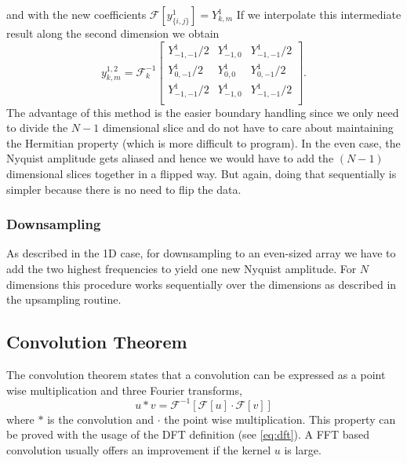 \documentclass{juliacon}
\begin{document}
            and with the new coefficients $\mathcal{F} \left[y^{1}_{\{i, j\}} \right] =Y^{1}_{k, m} $  
            If we interpolate this intermediate result along the second dimension we obtain
            \begin{equation}
                y^{1,2}_{k, m} = \mathcal{F}_{k}^{-1}\begin{bmatrix}
                   Y^1_{-1, -1} /2 &  Y^1_{-1, 0} & Y^1_{-1, -1} / 2\\ 
                   Y^1_{0,-1} /2& Y^1_{0, 0} & Y^1_{0, -1} / 2\\
                   Y^1_{-1,-1}/2 & Y^1_{-1, 0}& Y^1_{-1, -1} / 2\\ 
                \end{bmatrix}.
            \end{equation}
            The advantage of this method is the easier boundary handling since we only 
            need to divide the $N-1$ dimensional slice and do not have to care about maintaining the 
            Hermitian property (which is more difficult to program).
            In the even case, the Nyquist amplitude gets aliased and hence we would have
            to add the $(N-1)$ dimensional slices together in a flipped way.
            But again, doing that sequentially is simpler because there is no need to flip the data. 
            
        \subsubsection{Downsampling}
            As described in the 1D case, for downsampling to an even-sized array we have to 
            add the two highest frequencies to yield one new Nyquist amplitude. For $N$ dimensions this 
            procedure works sequentially over the dimensions as described in the upsampling routine.
            
            
    \subsection{Convolution Theorem}
        The convolution theorem states that a convolution can be expressed as
        a point wise multiplication and three Fourier transforms,
        \begin{equation}
            u * v = \mathcal{F}^{-1}\left[\mathcal F[u] \cdot \mathcal{F}[v]\right]
        \end{equation}
        where $*$ is the convolution and $\cdot$ the point wise multiplication.
        This property can be proved with the usage of the DFT definition (see \autoref{eq:dft}).
        A FFT based convolution usually offers an improvement if the kernel $u$ is large.
        
\end{document}
